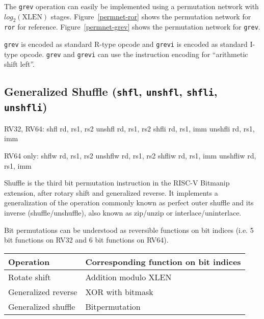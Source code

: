 The {\tt grev} operation can easily be implemented using a permutation
network with $log_2(\textrm{XLEN})$ stages. Figure~\ref{permnet-ror}
shows the permutation network for {\tt ror} for reference.
Figure~\ref{permnet-grev} shows the permutation network for {\tt grev}.

\texttt{grev} is encoded as standard R-type opcode and \texttt{grevi} is
encoded as standard I-type opcode. \texttt{grev} and \texttt{grevi} can
use the instruction encoding for ``arithmetic shift left''.

%
%
%


\subsection{Generalized Shuffle (\texttt{shfl}, \texttt{unshfl}, \texttt{shfli}, \texttt{unshfli})}
\label{gzip}

\begin{rvb}
  RV32, RV64:
    shfl rd, rs1, rs2
    unshfl rd, rs1, rs2
    shfli rd, rs1, imm
    unshfli rd, rs1, imm

  RV64 only:
    shflw rd, rs1, rs2
    unshflw rd, rs1, rs2
    shfliw rd, rs1, imm
    unshfliw rd, rs1, imm
\end{rvb}

Shuffle is the third bit permutation instruction in the RISC-V Bitmanip
extension, after rotary shift and generalized reverse. It implements a
generalization of the operation commonly known as perfect outer shuffle and its
inverse (shuffle/unshuffle), also known as zip/unzip or interlace/uninterlace.

Bit permutations can be understood as reversible functions on bit indices (i.e.
5 bit functions on RV32 and 6 bit functions on RV64).

\begin{center}
\begin{tabular}{l l}
Operation & Corresponding function on bit indices \\
\hline
Rotate shift & Addition modulo {\rm XLEN} \\
Generalized reverse & XOR with bitmask \\
Generalized shuffle & Bitpermutation \\
\end{tabular}
\end{center}

